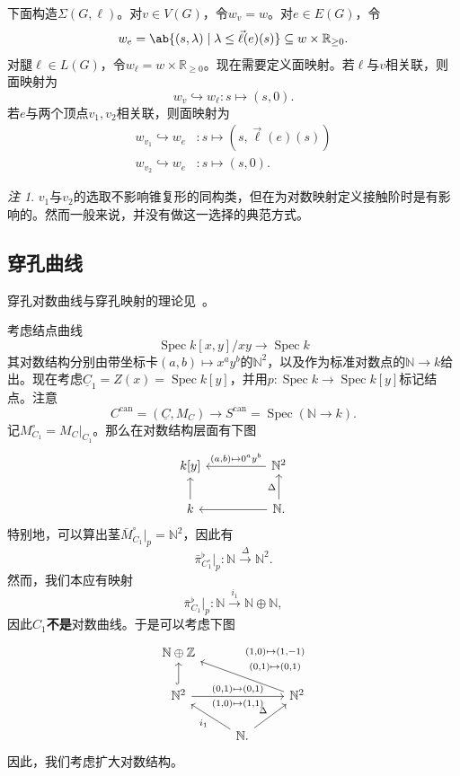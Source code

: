 \documentclass{amsart}
\theoremstyle{definition}
\theoremstyle{remark}
\newtheorem{rmk}[thm]{注}
\theoremstyle{plain}
\theoremstyle{definition}
\theoremstyle{remark}
\newcommand{\N}{\mathbb{N}}
\newcommand{\R}{\mathbb{R}}
\newcommand{\Z}{\mathbb{Z}}
\newcommand{\on}[1]{\operatorname{#1}}
\newcommand{\ul}[1]{\underline{#1}}
\newcommand{\1}{\mathbf{1}}
\newcommand{\2}{\mathbf{2}}
\newcommand{\3}{\mathbf{3}}
\DeclareMathOperator{\Spec}{Spec}
\begin{document}
下面构造\(\Sigma(G, \ell)\)。对\(v \in V(G)\)，令\(w_v = w\)。对\(e \in E(G)\)，令
\[ w_e = \ab\{ (s, \lambda) \mid \lambda \leq \vec{\ell}(e)(s) \} \subseteq w \times \R_{\geq 0}. \]
对腿\(\ell \in L(G)\)，令\(w_{\ell} = w \times \R_{\geq 0}\)。现在需要定义面映射。若\(\ell\)与\(v\)相关联，则面映射为
\[ w_v \hookrightarrow w_{\ell} \colon s \mapsto (s, 0). \]
若\(e\)与两个顶点\(v_1, v_2\)相关联，则面映射为
\begin{align*}
    w_{v_1} \hookrightarrow w_e &\colon s \mapsto (s, \vec{\ell}(e)(s)) \\
    w_{v_2} \hookrightarrow w_e & \colon s \mapsto (s, 0).
\end{align*}
\begin{rmk}
    \(v_1\)与\(v_2\)的选取不影响锥复形的同构类，但在为对数映射定义接触阶时是有影响的。然而一般来说，并没有做这一选择的典范方式。
\end{rmk}

\subsection{穿孔曲线}%
\label{sub:Punctured curves}

穿孔对数曲线与穿孔映射的理论见~\cite{ACGS2025}。

考虑结点曲线
\[ \Spec k[x,y]/xy \to \Spec k \]
其对数结构分别由带坐标卡\((a,b) \mapsto x^a y^b\)的\(\N^2\)，以及作为标准对数点的\(\N \to k\)给出。现在考虑\(\ul{C}_1 = Z(x) = \Spec k[y]\)，并用\(p \colon \Spec k \to \Spec k[y]\)标记结点。注意
\[ C^{\on{can}} = (\ul{C}, M_C) \to S^{\on{can}} = \Spec(\N \to k). \]
记\(M_{C_1}^{\circ} = M_C|_{C_1}\)。那么在对数结构层面有下图
\begin{equation*}
\begin{tikzcd}
    k[y] & & \N^2 \ar{ll}[swap]{(a,b) \mapsto 0^a y^b} \\
    k \ar{u} & & \N \ar{ll} \ar{u}{\Delta}.
\end{tikzcd}
\end{equation*}
特别地，可以算出茎\(\bar{M}_{C_1}^{\circ}|_p = \N^2\)，因此有
\[ \bar{\pi}_{C_1^{\circ}}^{\flat} |_p \colon \N \xrightarrow{\Delta} \N^2. \]
然而，我们本应有映射
\[ \bar{\pi}^{\flat}_{C_1}|_p \colon \N \xrightarrow{i_1} \N \oplus \N, \]
因此\(C_1\)\textbf{不是}对数曲线。于是可以考虑下图
\begin{equation*}
\begin{tikzcd}
    \N \oplus \Z \\
    \N^2 \ar[hookrightarrow]{u} \ar{rr}{(0,1)\mapsto (0,1)}[swap]{(1,0)\mapsto (1,1)} & & \N^2 \ar{ull}[swap]{\Vectorstack{{(1,0)\mapsto(1,-1)} {(0,1)\mapsto(0,1)}}} \\
    & \N \ar{ul}{i_1} \ar{ur}{\Delta}.
\end{tikzcd}
\end{equation*}
因此，我们考虑扩大对数结构。
\end{document}
